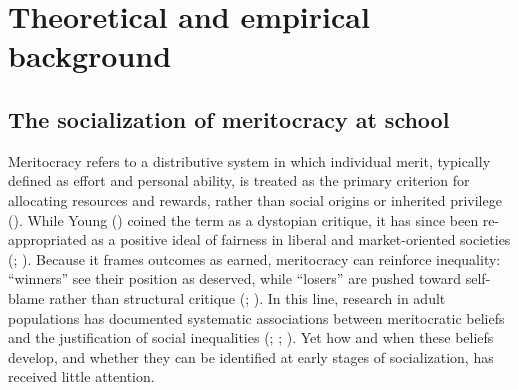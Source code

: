 \documentclass[
  11pt,
]{article}
\begin{document}
\section{Theoretical and empirical
background}\label{theoretical-and-empirical-background}

\subsection{The socialization of meritocracy at
school}\label{the-socialization-of-meritocracy-at-school}

Meritocracy refers to a distributive system in which individual merit,
typically defined as effort and personal ability, is treated as the
primary criterion for allocating resources and rewards, rather than
social origins or inherited privilege
(). While Young
() coined the term as a dystopian
critique, it has since been re-appropriated as a positive ideal of
fairness in liberal and market-oriented societies
(;
).
Because it frames outcomes as earned, meritocracy can reinforce
inequality: ``winners'' see their position as deserved, while ``losers''
are pushed toward self-blame rather than structural critique
(;
). In this line,
research in adult populations has documented systematic associations
between meritocratic beliefs and the justification of social
inequalities (;
;
). Yet how and when these beliefs develop, and whether they can be
identified at early stages of socialization, has received little
attention.
\end{document}
